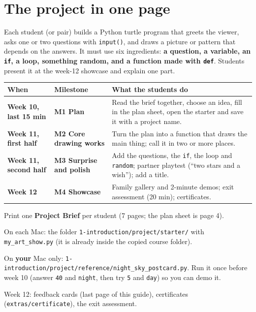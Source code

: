 \documentclass[level=1,teacher]{kidscode}
\begin{document}
\tableofcontents

\section{The project in one page}
Each student (or pair) builds a Python turtle program that greets the viewer, asks one or two
questions with \texttt{input()}, and draws a picture or pattern that depends on the answers.
It must use six ingredients: \textbf{a question, a variable, an \texttt{if}, a loop, something random,
and a function made with \texttt{def}}. Students present it at the week-12 showcase and explain one part.

\renewcommand{\arraystretch}{1.35}
\begin{tabularx}{\linewidth}{@{}>{\bfseries}p{2.4cm}>{\bfseries}p{3.4cm}X@{}}
\toprule
When & Milestone & What the students do\\
\midrule
Week 10, last 15 min & M1 Plan & Read the brief together, choose an idea, fill in the plan sheet, open the starter and save it with a project name.\\
Week 11, first half & M2 Core drawing works & Turn the plan into a function that draws the main thing; call it in two or more places.\\
Week 11, second half & M3 Surprise and polish & Add the questions, the \texttt{if}, the loop and \texttt{random}; partner playtest (\enquote{two stars and a wish}); add a title.\\
Week 12 & M4 Showcase & Family gallery and 2-minute demos; exit assessment (20 min); certificates.\\
\bottomrule
\end{tabularx}

\begin{materials}
  \item Print one \textbf{Project Brief} per student (7 pages; the plan sheet is page 4).
  \item On each Mac: the folder \texttt{1-introduction/\allowbreak{}project/\allowbreak{}starter/\allowbreak{}} with \texttt{my\_art\_show.py}
        (it is already inside the copied course folder).
  \item On \textbf{your} Mac only: \texttt{1-introduction/\allowbreak{}project/\allowbreak{}reference/\allowbreak{}night\_sky\_postcard.py}.
        Run it once before week 10 (answer \texttt{40} and \texttt{night}, then try \texttt{5} and \texttt{day}) so you can demo it.
  \item Week 12: feedback cards (last page of this guide), certificates (\texttt{extras/\allowbreak{}certificate}), the exit assessment.
\end{materials}
\end{document}
